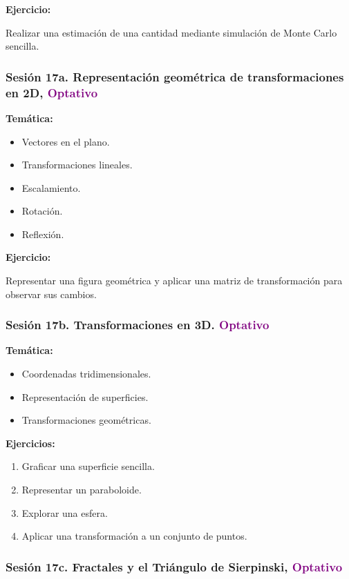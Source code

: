 \documentclass[12pt,letterpaper]{article}
\begin{document}
\textbf{Ejercicio:}

Realizar una estimación de una cantidad mediante simulación de Monte Carlo sencilla.
\subsubsection*{Sesión 17a. Representación geométrica de transformaciones en 2D, {\textcolor{purple}{Optativo}}}

\textbf{Temática:}
\begin{itemize}[noitemsep]
    \item Vectores en el plano.
    \item Transformaciones lineales.
    \item Escalamiento.
    \item Rotación.
    \item Reflexión.
\end{itemize}

\textbf{Ejercicio:}

Representar una figura geométrica y aplicar una matriz de transformación para observar sus cambios.

\subsubsection*{Sesión 17b. Transformaciones en 3D. {\textcolor{purple}{Optativo}}}

\textbf{Temática:}
\begin{itemize}[noitemsep]
    \item Coordenadas tridimensionales.
    \item Representación de superficies.
    \item Transformaciones geométricas.
\end{itemize}

\textbf{Ejercicios:}
\begin{enumerate}[noitemsep]
    \item Graficar una superficie sencilla.
    \item Representar un paraboloide.
    \item Explorar una esfera.
    \item Aplicar una transformación a un conjunto de puntos.
\end{enumerate}

\subsubsection*{Sesión 17c. Fractales y el Triángulo de Sierpinski, {\textcolor{purple}{Optativo}}}
\end{document}
